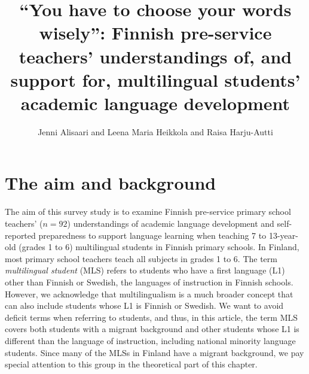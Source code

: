 \documentclass[output=paper]{langscibook}
\author{Jenni Alisaari\orcid{}\affiliation{Stockholm University} and Leena Maria Heikkola\orcid{}\affiliation{Åbo Akademi University} and Raisa Harju-Autti\orcid{}\affiliation{University of Jyväskylä}}
\title[“You have to choose your words wisely”]{“You have to choose your words wisely”: Finnish pre-service teachers’ understandings of, and support for, multilingual students’ academic language development}
\begin{document}
\maketitle 
\label{chap:7}



\section{The aim and background}\label{sec:alisaari:1}

The aim of this survey study is to examine Finnish pre-service primary school teachers’ ($n = 92$) understandings of academic language development and self-reported preparedness to support language learning when teaching 7 to 13-year-old (grades 1 to 6) multilingual students in Finnish primary schools. In Finland, most primary school teachers teach all subjects in grades 1 to 6. The term \textit{multilingual student} (MLS) refers to students who have a first language (L1) other than Finnish or Swedish, the languages of instruction in Finnish schools. However, we acknowledge that multilingualism is a much broader concept that can also include students whose L1 is Finnish or Swedish. We want to avoid deficit terms when referring to students, and thus, in this article, the term MLS covers both students with a migrant background and other students whose L1 is different than the language of instruction, including national minority language students.  Since many of the MLSs in Finland have a migrant background, we pay special attention to this group in the theoretical part of this chapter. 
\end{document}
